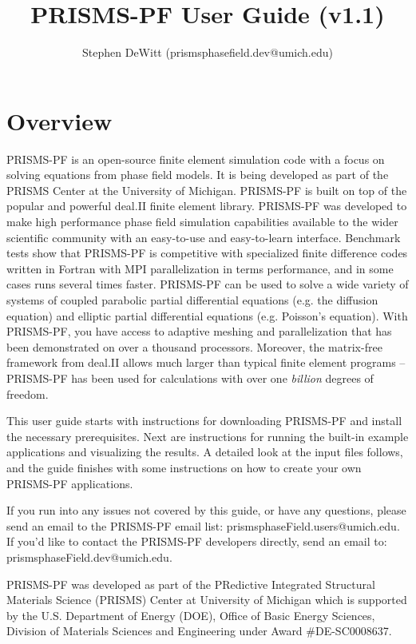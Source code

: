 \documentclass[10pt]{article} %
\title{PRISMS-PF User Guide (v1.1)}
\author{Stephen DeWitt (prismsphasefield.dev@umich.edu)}
\begin{document}
\maketitle

\tableofcontents

\clearpage

\section{Overview}
PRISMS-PF is an open-source finite element simulation code with a focus on solving equations from phase field models. It is being developed as part of the PRISMS Center at the University of Michigan. PRISMS-PF is built on top of the popular and powerful deal.II finite element library. PRISMS-PF was developed to make high performance phase field simulation capabilities available to the wider scientific community with an easy-to-use and easy-to-learn interface. Benchmark tests show that PRISMS-PF is competitive with specialized finite difference codes written in Fortran with MPI parallelization in terms performance,  and in some cases runs several times faster. PRISMS-PF can be used to solve a wide variety of systems of coupled parabolic partial differential equations (e.g. the diffusion equation) and elliptic partial differential equations (e.g. Poisson's equation). With PRISMS-PF, you have access to adaptive meshing and parallelization that has been demonstrated on over a thousand processors. Moreover, the matrix-free framework from deal.II allows much larger than typical finite element programs -- PRISMS-PF has been used for calculations with over one \emph{billion} degrees of freedom.

This user guide starts with instructions for downloading PRISMS-PF and install the necessary prerequisites. Next are instructions for running the built-in example applications and visualizing the results. A detailed look at the input files follows, and the guide finishes with some instructions on how to create your own PRISMS-PF applications.

If you run into any issues not covered by this guide, or have any questions, please send an email to the PRISMS-PF email list: prismsphaseField.users@umich.edu. If you'd like to contact the PRISMS-PF developers directly, send an email to: prismsphaseField.dev@umich.edu.

PRISMS-PF was developed as part of the PRedictive Integrated Structural Materials Science (PRISMS) Center at University of Michigan which is supported by the U.S. Department of Energy (DOE), Office of Basic Energy Sciences, Division of Materials Sciences and Engineering under Award \#DE-SC0008637.
\end{document}
